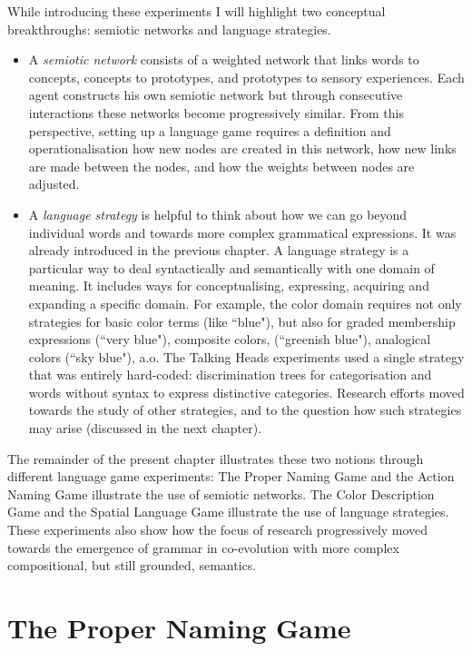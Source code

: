 While introducing these experiments I will highlight two conceptual breakthroughs: semiotic networks and language strategies. 
\begin{itemize}
\item A {\it semiotic network} consists of a weighted network that links words to concepts, concepts to prototypes, and prototypes to 
sensory experiences. Each agent constructs his own semiotic network but through consecutive 
interactions these networks become progressively similar. From this perspective, setting up a language game requires a definition and 
operationalisation how new nodes are created in this network, how new links are made between 
the nodes, and how the weights between nodes are adjusted. 
\item A {\it language strategy} is helpful to think about how we can go beyond individual words and towards 
more complex grammatical expressions. It was already introduced in the previous chapter. 
A language strategy is a particular way to deal syntactically and semantically 
with one domain of meaning. It includes ways for conceptualising, expressing, acquiring and expanding a specific domain. 
For example, the color domain requires not only strategies for basic color terms (like ``blue"), but also for 
graded membership expressions (``very blue"), composite colors, (``greenish blue"), analogical colors (``sky blue"), a.o. 
The Talking Heads experiments used a single strategy that was entirely hard-coded: discrimination trees for categorisation 
and words without syntax to express distinctive categories. Research efforts moved towards the study of other strategies, and 
to the question how such strategies may arise (discussed in the next chapter). 
\end{itemize}
The remainder of the present chapter illustrates these two notions through different language game experiments: The Proper 
Naming Game and the Action Naming Game illustrate the use of semiotic networks. The Color Description Game and the 
Spatial Language Game illustrate the use of language strategies. These experiments also show how the focus of research 
progressively moved towards the emergence of grammar in co-evolution with more complex compositional, but still 
grounded, semantics. 

\section{The Proper Naming Game}

